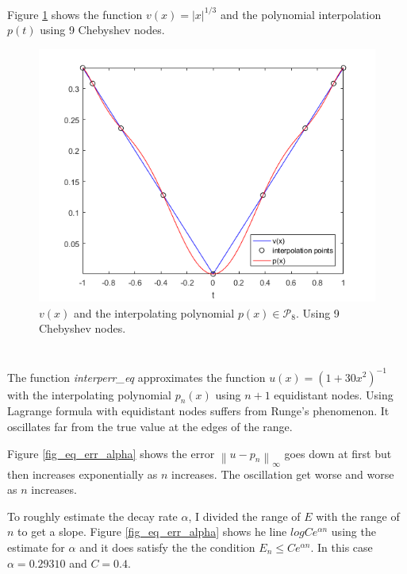 \documentclass[12pt]{article}
\newcommand{\norm}[1]{\left\lVert#1\right\rVert}
\newcommand{\abs}[1]{\left|#1\right|}
\begin{document}
\subsection{} %

Figure \ref{fig_vt_pt} shows the function $v(x) = \abs{x}^{1/3}$ and the polynomial interpolation $p(t)$ using 9 Chebyshev nodes.

\begin{figure}
    \includegraphics[width=.6\linewidth]{vt_pt}
    \centering
    \caption{$v(x)$ and the interpolating polynomial $p(x) \in \mathcal{P}_{8}$. Using 9 Chebyshev nodes.}
    \label{fig_vt_pt}
\end{figure}


\section{} %

\subsection{} %
The function \textit{interperr\_eq} approximates the function $u(x) = (1+30x^2)^{-1}$ with the interpolating polynomial $p_n(x)$ using $n+1$ equidistant nodes. Using Lagrange formula with equidistant nodes suffers from Runge's phenomenon. It oscillates far from the true value at the edges of the range.

Figure \ref{fig_eq_err_alpha} shows the error $\norm{u-p_n}_{\infty}$ goes down at first but then increases exponentially as $n$ increases. The oscillation get worse and worse as $n$ increases.

To roughly estimate the decay rate $\alpha$, I divided the range of $E$ with the range of $n$ to get a slope. Figure \ref{fig_eq_err_alpha} shows he line $log Ce^{\alpha n}$ using the estimate for $\alpha$ and it does satisfy the the condition $E_n \le Ce^{\alpha n}$.
In this case $\alpha = 0.29310$ and $C = 0.4$.
\end{document}
